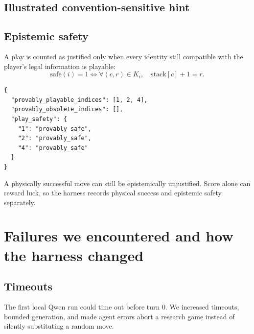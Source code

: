 \documentclass[11pt,a4paper]{article}
\begin{document}
\subsection{Illustrated convention-sensitive hint}

\begin{figure}[H]
\centering
{}
\end{figure}

\subsection{Epistemic safety}

A play is counted as justified only when every identity still compatible with the player's legal information is playable:
\[
\mathrm{safe}(i)=1
\iff
\forall(c,r)\in K_i,\quad \mathrm{stack}[c]+1=r.
\]

\begin{lstlisting}
{
  "provably_playable_indices": [1, 2, 4],
  "provably_obsolete_indices": [],
  "play_safety": {
    "1": "provably_safe",
    "2": "provably_safe",
    "4": "provably_safe"
  }
}
\end{lstlisting}

\begin{warningbox}
A physically successful move can still be epistemically unjustified. Score alone can reward luck, so the harness records physical success and epistemic safety separately.
\end{warningbox}

\section{Failures we encountered and how the harness changed}

\subsection{Timeouts}
The first local Qwen run could time out before turn 0. We increased timeouts, bounded generation, and made agent errors abort a research game instead of silently substituting a random move.
\end{document}
